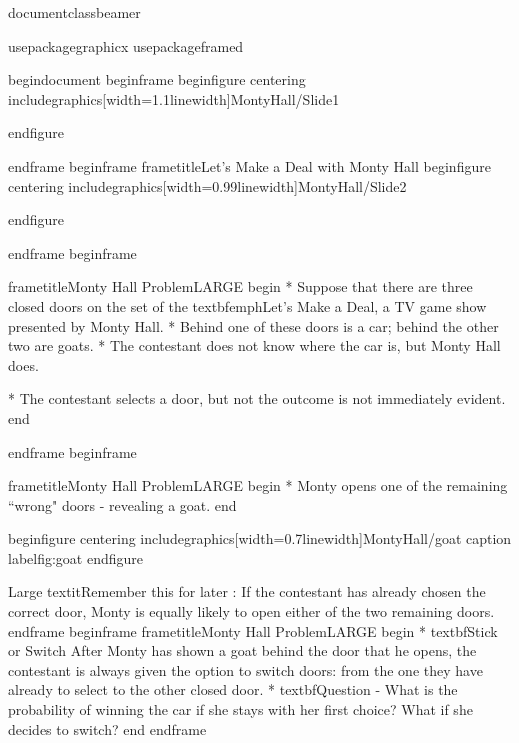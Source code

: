documentclass{beamer}

usepackage{graphicx}
usepackage{framed}

begin{document}
begin{frame}
begin{figure}
centering
includegraphics[width=1.1linewidth]{MontyHall/Slide1}


end{figure}

end{frame}
begin{frame}
	frametitle{Let's Make a Deal with Monty Hall}
	begin{figure}
		centering
		includegraphics[width=0.99linewidth]{MontyHall/Slide2}
		
	end{figure}
	
end{frame}
begin{frame}
	
	frametitle{Monty Hall Problem}LARGE
	begin{ }
	         * Suppose that there are three closed doors on the set of the  textbf{emph{Let's Make a Deal}}, a TV game show presented by Monty Hall. 
	         * Behind one of these doors is a car; behind the other two are goats. 
	         * The contestant does not know where the car is, but Monty Hall does.
	
	         * 
	The contestant selects a door, but not the outcome is not immediately evident. 
	end{ }
	
end{frame}
begin{frame}
	
	frametitle{Monty Hall Problem}LARGE
	begin{ }
	         * Monty opens one of the remaining ``wrong" doors - revealing a goat.
end{ }

begin{figure}
centering
includegraphics[width=0.7linewidth]{MontyHall/goat}
caption{}
label{fig:goat}
end{figure}

	{ Large textit{Remember this for later : If the contestant has already chosen the correct door, Monty is equally likely to open either of the two remaining doors.}
}
end{frame}
begin{frame}
	frametitle{Monty Hall Problem}LARGE
	begin{ }
		         * textbf{Stick or Switch}
	After Monty has shown a goat behind the door that he opens, the contestant is always given the option to switch doors: from the one they have already to select to the other closed door. 
	         * textbf{Question} -  What is the probability of winning the car if she stays with her first choice? What if she decides to switch?
	end{ }
end{frame}

